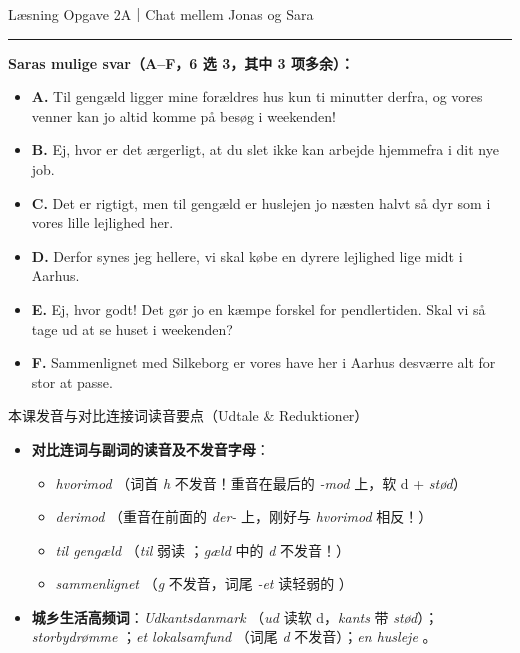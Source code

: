 \begin{emailbox}{Læsning Opgave 2A｜Chat mellem Jonas og Sara}
\vspace{0.4em}
\hrule
\vspace{0.3em}
\small
\textbf{Saras mulige svar（A--F，6 选 3，其中 3 项多余）：}
\begin{itemize}[label={}, leftmargin=0.8em]
  \item \textbf{A.} Til gengæld ligger mine forældres hus kun ti minutter derfra, og vores venner kan jo altid komme på besøg i weekenden!
  \item \textbf{B.} Ej, hvor er det ærgerligt, at du slet ikke kan arbejde hjemmefra i dit nye job.
  \item \textbf{C.} Det er rigtigt, men til gengæld er huslejen jo næsten halvt så dyr som i vores lille lejlighed her.
  \item \textbf{D.} Derfor synes jeg hellere, vi skal købe en dyrere lejlighed lige midt i Aarhus.
  \item \textbf{E.} Ej, hvor godt! Det gør jo en kæmpe forskel for pendlertiden. Skal vi så tage ud at se huset i weekenden?
  \item \textbf{F.} Sammenlignet med Silkeborg er vores have her i Aarhus desværre alt for stor at passe.
\end{itemize}
\end{emailbox}

\begin{tipbox}{本课发音与对比连接词读音要点（Udtale \& Reduktioner）}
\begin{itemize}
  \item \textbf{对比连词与副词的读音及不发音字母}：
    \begin{itemize}
      \item \textit{hvorimod} （词首 \textit{h} 不发音！重音在最后的 \textit{-mod} 上，软 d + \textit{stød}）
      \item \textit{derimod} （重音在前面的 \textit{der-} 上，刚好与 \textit{hvorimod} 相反！）
      \item \textit{til gengæld} （\textit{til} 弱读 ；\textit{gæld} 中的 \textit{d} 不发音！）
      \item \textit{sammenlignet} （\textit{g} 不发音，词尾 \textit{-et} 读轻弱的 ）
    \end{itemize}
  \item \textbf{城乡生活高频词}：\textit{Udkantsdanmark} （\textit{ud} 读软 d，\textit{kants} 带 \textit{stød}）；\textit{storbydrømme} ；\textit{et lokalsamfund} （词尾 \textit{d} 不发音）；\textit{en husleje} 。
\end{itemize}
\end{tipbox}

